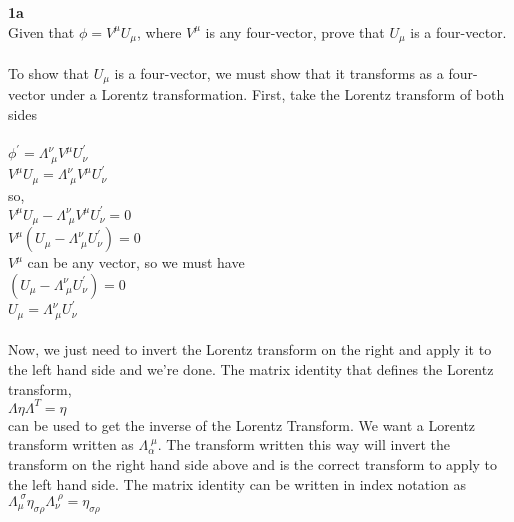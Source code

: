 \documentclass[prb,preprint]
{revtex4-1}
\begin{document}
\textbf{1a}
\\
Given that $\phi = V^\mu U_\mu$, where $V^\mu$ is any four-vector, prove that $U_\mu$ is a four-vector.
\\
\\
To show that $U_\mu$ is a four-vector, we must show that it transforms as a four-vector under a Lorentz transformation.  First, take the Lorentz transform of both sides
\\
\\
$\phi^\prime = \Lambda^\nu_{\;\mu} V^\mu U^\prime_\nu$
\\
$V^\mu U_\mu = \Lambda^\nu_{\;\mu} V^\mu U^\prime_\nu$
\\
so, 
\\
$V^\mu U_\mu - \Lambda^\nu_{\;\mu} V^\mu U^\prime_\nu = 0$
\\
$V^\mu \left(U_\mu - \Lambda^\nu_{\;\mu} U^\prime_\nu\right) = 0$
\\
$V^\mu$ can be any vector, so we must have 
\\
$\left(U_\mu - \Lambda^\nu_{\;\mu} U^\prime_\nu\right) = 0$
\\
$U_\mu = \Lambda^\nu_{\;\mu} U^\prime_\nu$
\\
\\
Now, we just need to invert the Lorentz transform on the right and apply it to the left hand side and we're done.  The matrix identity that defines the Lorentz transform, 
\\
$\Lambda \eta \Lambda^T = \eta$
\\
can be used to get the inverse of the Lorentz Transform.  We want a Lorentz transform written as $\Lambda^{\;\mu}_\alpha$.  The transform written this way will invert the transform on the right hand side above and is the correct transform to apply to the left hand side.  The matrix identity can be written in index notation as 
\\
$\Lambda_\mu^{\;\sigma} \eta_{\sigma \rho} \Lambda_\nu^{\;\rho} = \eta_{\sigma\rho}$
\end{document}
